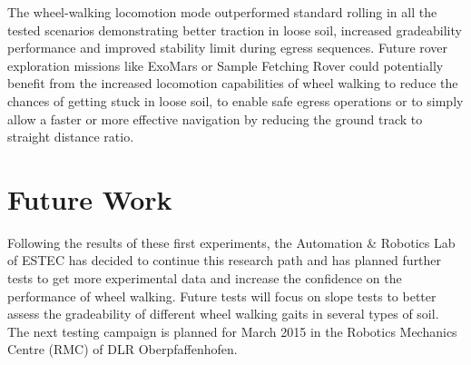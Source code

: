\documentclass[a4paper,twocolumn]{esapub2005} %
\begin{document}
The wheel-walking locomotion mode outperformed standard rolling in all the tested scenarios demonstrating better traction in loose soil, increased gradeability performance and improved stability limit during egress sequences. Future rover exploration missions like ExoMars or Sample Fetching Rover could potentially benefit from the increased locomotion capabilities of wheel walking to reduce the chances of getting stuck in loose soil, to enable safe egress operations or to simply allow a faster or more effective navigation by reducing the ground track to straight distance ratio.

\section{Future Work}

Following the results of these first experiments, the Automation \& Robotics Lab of ESTEC has decided to continue this research path and has planned further tests to get more experimental data and increase the confidence on the performance of wheel walking. 
Future tests will focus on slope tests to better assess the gradeability of different wheel walking gaits in several types of soil.
The next testing campaign is planned for March 2015 in the Robotics Mechanics Centre (RMC) of DLR Oberpfaffenhofen.


\vspace{-3 mm}




\end{document}
